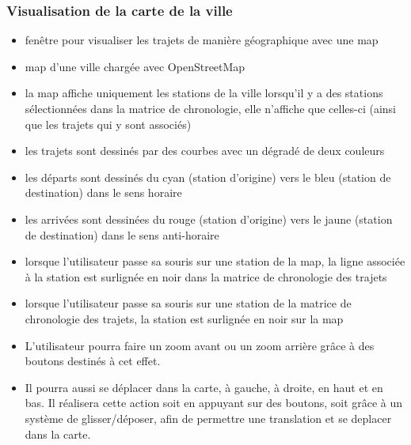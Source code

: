 \documentclass[12pt]{article}
\begin{document}
			\subsubsection{Visualisation de la carte de la ville}
				\begin{itemize}
					\item fenêtre pour visualiser les trajets de manière géographique avec une map
					\item map d'une ville chargée avec OpenStreetMap
					\item la map affiche uniquement les stations de la ville lorsqu'il y a des stations sélectionnées dans la matrice de chronologie, elle n'affiche que celles-ci (ainsi que les trajets qui y sont associés)
					\item les trajets sont dessinés par des courbes avec un dégradé de deux couleurs
					\item les départs sont dessinés du cyan (station d'origine) vers le bleu (station de destination) dans le sens horaire
					\item les arrivées sont dessinées du rouge (station d'origine) vers le jaune (station de destination) dans le sens anti-horaire
					\item lorsque l'utilisateur passe sa souris sur une station de la map, la ligne associée à la station est surlignée en noir dans la matrice de chronologie des trajets
					\item lorsque l'utilisateur passe sa souris sur une station de la matrice de chronologie des trajets, la station est surlignée en noir sur la map
					\item L'utilisateur pourra faire un zoom avant ou un zoom arrière grâce à des boutons destinés à cet effet.
					\item Il pourra aussi se déplacer dans la carte, à gauche, à droite, en haut et en bas. Il réalisera cette action soit en appuyant sur des boutons, soit grâce à un système de glisser/déposer, afin de permettre une translation et se deplacer dans la carte.
				\end{itemize}
\end{document}
